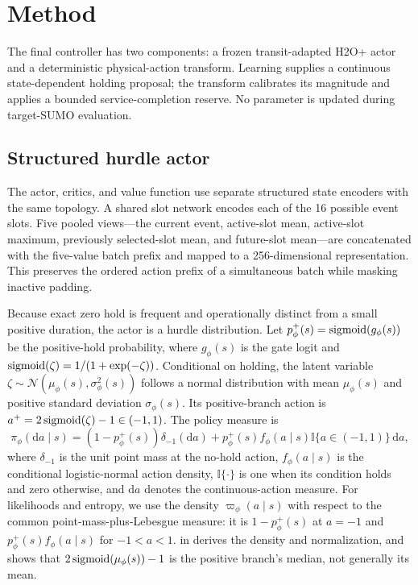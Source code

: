 \section{Method}
\label{sec:method}

The final controller has two components: a frozen transit-adapted H2O+ actor
and a deterministic physical-action transform. Learning supplies a continuous
state-dependent holding proposal; the transform calibrates its magnitude and
applies a bounded service-completion reserve. No parameter is updated during
target-SUMO evaluation.

\subsection{Structured hurdle actor}
\label{sec:method:architecture}

The actor, critics, and value function use separate structured state encoders
with the same topology. A shared slot network encodes each of the 16 possible
event slots. Five pooled views---the current event, active-slot mean,
active-slot maximum, previously selected-slot mean, and future-slot
mean---are concatenated with the five-value batch prefix and mapped to a
256-dimensional representation. This preserves the ordered action prefix of a
simultaneous batch while masking inactive padding.

Because exact zero hold is frequent and operationally distinct from a small
positive duration, the actor is a hurdle distribution. Let
$p^+_{\phi}(s)=\operatorname{sigmoid}(g_{\phi}(s))$ be the positive-hold
probability, where $g_{\phi}(s)$ is the gate logit and
$\operatorname{sigmoid}(\zeta)=1/(1+\exp(-\zeta))$. Conditional on holding, the latent variable
$\zeta\sim\mathcal{N}(\mu_{\phi}(s),\sigma_{\phi}^2(s))$ follows a normal
distribution with mean $\mu_{\phi}(s)$ and positive standard deviation
$\sigma_{\phi}(s)$. Its positive-branch action is
$a^+=2\operatorname{sigmoid}(\zeta)-1\in(-1,1)$. The policy measure is
\begin{equation}
\pi_{\phi}(\mathrm{d}a\mid s)=
\left(1-p^+_{\phi}(s)\right)\delta_{-1}(\mathrm{d}a)
+p^+_{\phi}(s)f_{\phi}(a\mid s)
\mathbb{I}\{a\in(-1,1)\}\,\mathrm{d}a,
\label{eq:hurdle_policy}
\end{equation}
where $\delta_{-1}$ is the unit point mass at the no-hold action,
$f_{\phi}(a\mid s)$ is the conditional logistic-normal action density,
$\mathbb{I}\{\cdot\}$ is one when its condition holds and zero otherwise,
and $\mathrm{d}a$ denotes the continuous-action measure. For likelihoods and
entropy, we use the density $\varpi_{\phi}(a\mid s)$ with respect to the common
point-mass-plus-Lebesgue measure: it is $1-p^+_{\phi}(s)$ at $a=-1$ and
$p^+_{\phi}(s)f_{\phi}(a\mid s)$ for $-1<a<1$.
 in  derives the density and
normalization, and shows that $2\operatorname{sigmoid}(\mu_{\phi}(s))-1$ is the positive
branch's median, not generally its mean.

